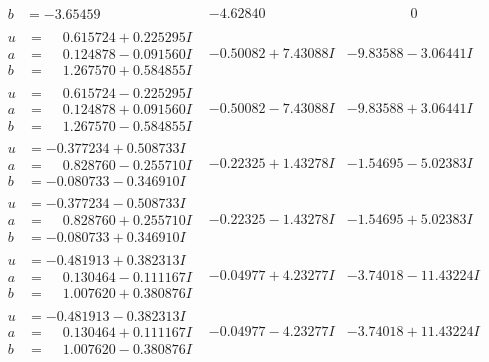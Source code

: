 \documentclass[1p]{elsarticle_modified}
\theoremstyle{definition}
\begin{document}
$$\begin{array}{c|c|c}
\begin{aligned}
b &= -3.65459\phantom{ +0.000000I}\end{aligned}
 & -4.62840\phantom{ +0.000000I} & \phantom{-0.000000 } 0 \\ \hline\begin{aligned}
u &= \phantom{-}0.615724 + 0.225295 I \\
a &= \phantom{-}0.124878 - 0.091560 I \\
b &= \phantom{-}1.267570 + 0.584855 I\end{aligned}
 & -0.50082 + 7.43088 I & -9.83588 - 3.06441 I \\ \hline\begin{aligned}
u &= \phantom{-}0.615724 - 0.225295 I \\
a &= \phantom{-}0.124878 + 0.091560 I \\
b &= \phantom{-}1.267570 - 0.584855 I\end{aligned}
 & -0.50082 - 7.43088 I & -9.83588 + 3.06441 I \\ \hline\begin{aligned}
u &= -0.377234 + 0.508733 I \\
a &= \phantom{-}0.828760 - 0.255710 I \\
b &= -0.080733 - 0.346910 I\end{aligned}
 & -0.22325 + 1.43278 I & -1.54695 - 5.02383 I \\ \hline\begin{aligned}
u &= -0.377234 - 0.508733 I \\
a &= \phantom{-}0.828760 + 0.255710 I \\
b &= -0.080733 + 0.346910 I\end{aligned}
 & -0.22325 - 1.43278 I & -1.54695 + 5.02383 I \\ \hline\begin{aligned}
u &= -0.481913 + 0.382313 I \\
a &= \phantom{-}0.130464 - 0.111167 I \\
b &= \phantom{-}1.007620 + 0.380876 I\end{aligned}
 & -0.04977 + 4.23277 I & -3.74018 - 11.43224 I \\ \hline\begin{aligned}
u &= -0.481913 - 0.382313 I \\
a &= \phantom{-}0.130464 + 0.111167 I \\
b &= \phantom{-}1.007620 - 0.380876 I\end{aligned}
 & -0.04977 - 4.23277 I & -3.74018 + 11.43224 I \\ \hline\begin{aligned}

\end{aligned}
\end{array}$$
\end{document}
